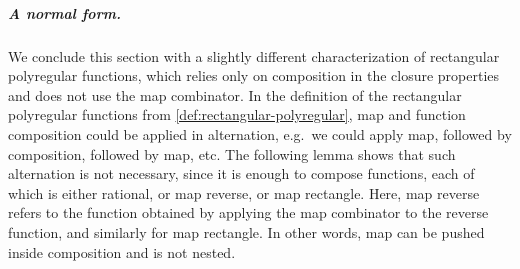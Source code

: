 \documentclass[a4paper,UKenglish,cleveref, autoref, thm-restate]{lipics-v2021}
\begin{document}
\subparagraph{A normal form.} We conclude this section with a slightly different characterization of rectangular polyregular functions, which relies only on composition in the closure properties and does not use the map combinator. 
In the definition of the rectangular polyregular functions from \cref{def:rectangular-polyregular}, map and function composition could be applied in alternation, e.g.~we could apply  map, followed by composition, followed by map, etc. The following lemma shows that such alternation is not necessary, since it is enough to compose functions, each of which is either rational, or map reverse, or map rectangle. Here, map reverse refers to the function obtained by applying the map combinator to the reverse function, and similarly for map rectangle. In other words, map can be pushed inside composition and is not nested.
\end{document}

